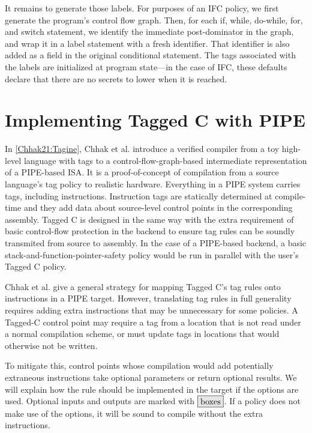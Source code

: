 \documentclass{llncs}
\begin{document}
It remains to generate those labels. For purposes of an IFC policy, we first generate the program's
control flow graph. Then, for each if, while, do-while, for, and switch statement, we identify the
immediate post-dominator in the graph, and wrap it in a label statement with a fresh identifier.
That identifier is also added as a field in the original conditional statement. The tags
associated with the labels are initialized at program state---in the case of IFC, these defaults
declare that there are no secrets to lower when it is reached.

\section{Implementing Tagged C with PIPE}
\label{sec:optionals}

In \cref{Chhak21:Tagine}, Chhak et al. introduce a verified compiler from a toy
high-level language with tags
to a control-flow-graph-based intermediate representation of a PIPE-based
ISA. It is a proof-of-concept of compilation from a source language's tag policy to
realistic hardware. Everything in a PIPE system carries tags, including instructions. 
Instruction tags are statically determined at compile-time and they add data about source-level
control points in the corresponding assembly. Tagged C is designed in the same way with 
the extra requirement of basic control-flow protection in the backend to ensure tag rules
 can be soundly transmited from source to assembly. 
In the case of a PIPE-based backend, a basic stack-and-function-pointer-safety policy would be run in parallel 
with the user's Tagged C policy. 

Chhak et al. \cite{Chhak21:Tagine} give a general strategy for mapping Tagged C's tag rules
onto instructions in a PIPE target. However, translating tag rules in full generality
requires adding extra instructions that may be unnecessary for some policies. A Tagged-C control point
may require a tag from a location that is not read under a normal compilation scheme, or must update tags
in locations that would otherwise not be written.

To mitigate this, control points whose compilation would add potentially extraneous instructions
take optional parameters or return optional results. We will explain how the rule should be
implemented in the target if the options are used.  Optional inputs
and outputs are marked with \(\optional{boxes}\). If a policy does not make use of the options, it will
be sound to compile without the extra instructions.
\end{document}

